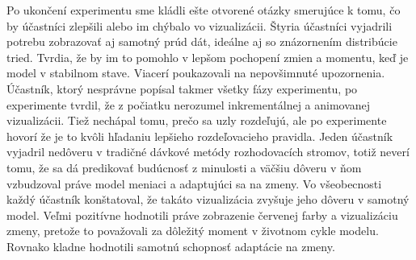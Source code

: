 Po ukončení experimentu sme kládli ešte otvorené otázky smerujúce k tomu, čo by účastníci zlepšili alebo im chýbalo vo vizualizácii. Štyria účastníci vyjadrili potrebu zobrazovať aj samotný prúd dát, ideálne aj so znázornením distribúcie tried. Tvrdia, že by im to pomohlo v lepšom pochopení zmien a momentu, keď je model v stabilnom stave. Viacerí poukazovali na nepovšimnuté upozornenia. Účastník, ktorý nesprávne popísal takmer všetky fázy experimentu, po experimente tvrdil, že z počiatku nerozumel inkrementálnej a animovanej vizualizácii. Tiež nechápal tomu, prečo sa uzly rozdeľujú, ale po experimente hovorí že je to kvôli hľadaniu lepšieho rozdeľovacieho pravidla. Jeden účastník vyjadril nedôveru v tradičné dávkové metódy rozhodovacích stromov, totiž neverí tomu, že sa dá predikovať budúcnosť z minulosti a väčšiu dôveru v ňom vzbudzoval práve model meniaci a adaptujúci sa na zmeny. Vo všeobecnosti každý účastník konštatoval, že takáto vizualizácia zvyšuje jeho dôveru v samotný model. Veľmi pozitívne hodnotili práve zobrazenie červenej farby a vizualizáciu zmeny, pretože to považovali za dôležitý moment v životnom cykle modelu. Rovnako kladne hodnotili samotnú schopnosť adaptácie na zmeny.







































